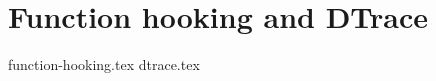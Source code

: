 \documentclass{report}
\begin{document}
\section{Function hooking and DTrace}
\label{sec:function-hooking}
{function-hooking.tex}
{dtrace.tex}

\end{document}
